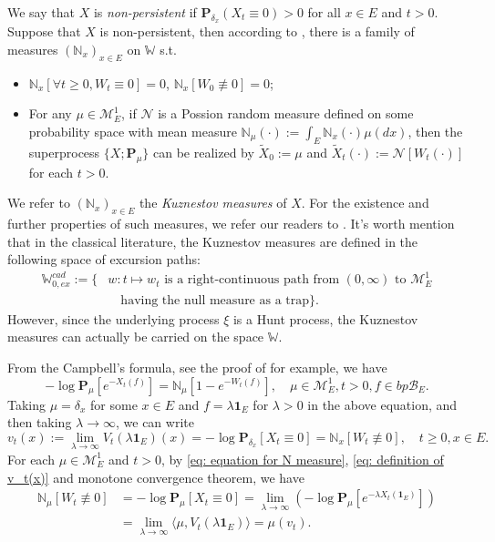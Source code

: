 \documentclass[12pt, a4paper]{amsart}
\theoremstyle{definition}
\numberwithin{equation}{section}
\begin{document}
	We say that $X$ is \emph{non-persistent} if $\mathbf P_{\delta_x}(X_t \equiv 0) > 0$ for all $x\in E$ and $t> 0$.
	Suppose that $X$ is non-persistent, then according to \cite[Section 8]{Li2011Measure-valued}, there is a family of measures $(\mathbb N_x)_{x\in E}$ on $\mathbb W$ s.t.
\begin{itemize}
	\item
	$\mathbb N_x [ \forall t \geq 0, W_t \equiv 0] =0$, $\mathbb N_x[W_0 \not\equiv 0] = 0$;
	\item
	For any $\mu \in \mathcal M_E^1$, if $\mathcal N$ is a Possion random %
	measure defined on some
	probability space with mean measure $\mathbb N_\mu(\cdot):= \int_E \mathbb N_x(\cdot )\mu(dx)$,
	then the superprocess $\{X;\mathbf P_\mu\}$ can be realized by $\tilde X_0 := \mu$ and $\tilde X_t(\cdot) := \mathcal N[W_t(\cdot)]$ for each $t>0$.
\end{itemize}
	We refer to $(\mathbb N_x)_{x\in E}$ the \emph{Kuznestov measures} of $X$.
	For the existence and further properties of such measures, we refer our readers to \cite{Li2011Measure-valued}.
	It's worth mention that in the classical literature, the Kuznestov measures are defined in the following space of excursion paths:
	\[\begin{split}
	\mathbb W^{cad}_{0,ex}:=\{ &w: t \mapsto w_t \text{ is a right-continuous path from $(0,\infty)$ to $\mathcal M_E^1$}
		\\&\quad \text {having the null measure as a trap}\}.
	\end{split} \]
	However, since the underlying process $\xi$ is a Hunt process, the Kuznestov measures can actually be carried on the space $\mathbb W$.
	
	From the Campbell's formula, see  the proof of \cite[Theorem 2.7]{Kyprianou2014Fluctuations} for example, we have
\[ \label{eq: equation for N measure}
	- \log \mathbf P_\mu [e^{-X_t(f)}]
	= \mathbb N_\mu[ 1-e^{- W_t(f)}],
	\quad \mu \in \mathcal M_E^1, t>0, f\in bp\mathscr B_E.
\]
	Taking $\mu = \delta_x$ for some $x\in E$ and $f = \lambda \mathbf 1_E$ for $\lambda > 0$ in the above equation, and then taking $\lambda \to \infty$, we can write
\[ \label{eq: definition of v_t(x)}
	v_t(x)
	:= \lim_{\lambda\to \infty} V_t(\lambda\mathbf 1_E)(x)
	= -\log \mathbf P_{\delta_x} [X_t \equiv 0]
	= \mathbb N_x[W_t\not \equiv 0],
	\quad t\geq 0, x\in E.
\]
	For each $\mu \in \mathcal M_E^1$ and $t > 0$, by \eqref{eq: equation for N measure}, \eqref{eq: definition of v_t(x)} and monotone convergence theorem, we have
\[ \label{eq: equation for mu v-t}\begin{split}
\mathbb N_\mu[W_t\not \equiv 0]
	&= -\log \mathbf P_{\mu} [X_t \equiv 0]
	= \lim_{\lambda \to \infty} (- \log \mathbf P_\mu [e^{-\lambda X_t(\mathbf 1_E)}])
	\\&= \lim_{\lambda \to \infty} \langle \mu, V_t(\lambda \mathbf 1_E)\rangle
	= \mu(v_t).
\end{split}\]
\end{document}
